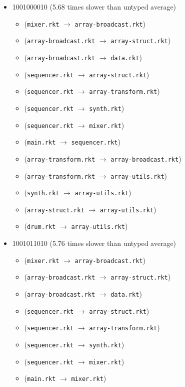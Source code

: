 \documentclass{article}
\newcommand{\mono}[1]{\texttt{#1}}
\begin{document}
\begin{itemize}
\item 1001000010 (5.68 times slower than untyped average)
  \begin{itemize}
  \item (\mono{mixer.rkt} $\rightarrow$ \mono{array-broadcast.rkt})
  \item (\mono{array-broadcast.rkt} $\rightarrow$ \mono{array-struct.rkt})
  \item (\mono{array-broadcast.rkt} $\rightarrow$ \mono{data.rkt})
  \item (\mono{sequencer.rkt} $\rightarrow$ \mono{array-struct.rkt})
  \item (\mono{sequencer.rkt} $\rightarrow$ \mono{array-transform.rkt})
  \item (\mono{sequencer.rkt} $\rightarrow$ \mono{synth.rkt})
  \item (\mono{sequencer.rkt} $\rightarrow$ \mono{mixer.rkt})
  \item (\mono{main.rkt} $\rightarrow$ \mono{sequencer.rkt})
  \item (\mono{array-transform.rkt} $\rightarrow$ \mono{array-broadcast.rkt})
  \item (\mono{array-transform.rkt} $\rightarrow$ \mono{array-utils.rkt})
  \item (\mono{synth.rkt} $\rightarrow$ \mono{array-utils.rkt})
  \item (\mono{array-struct.rkt} $\rightarrow$ \mono{array-utils.rkt})
  \item (\mono{drum.rkt} $\rightarrow$ \mono{array-utils.rkt})
  \end{itemize}
\item 1001011010 (5.76 times slower than untyped average)
  \begin{itemize}
  \item (\mono{mixer.rkt} $\rightarrow$ \mono{array-broadcast.rkt})
  \item (\mono{array-broadcast.rkt} $\rightarrow$ \mono{array-struct.rkt})
  \item (\mono{array-broadcast.rkt} $\rightarrow$ \mono{data.rkt})
  \item (\mono{sequencer.rkt} $\rightarrow$ \mono{array-struct.rkt})
  \item (\mono{sequencer.rkt} $\rightarrow$ \mono{array-transform.rkt})
  \item (\mono{sequencer.rkt} $\rightarrow$ \mono{synth.rkt})
  \item (\mono{sequencer.rkt} $\rightarrow$ \mono{mixer.rkt})
  \item (\mono{main.rkt} $\rightarrow$ \mono{mixer.rkt})

\end{itemize}
\end{itemize}
\end{document}
